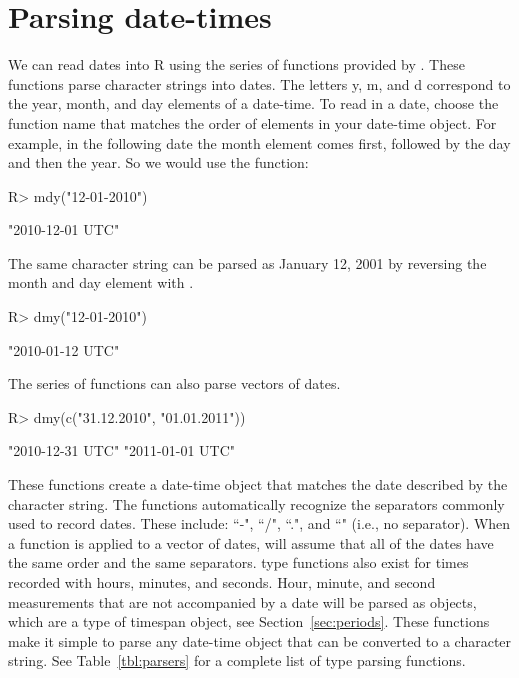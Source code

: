 \documentclass[article]{jss}
\begin{document}





\section{Parsing date-times}
\label{sec:parsing}

We can read dates into R using the  series of functions provided by . These functions parse character strings into dates. The letters y, m, and d correspond to the year, month, and day elements of a date-time. To read in a date, choose the function name that matches the order of elements in your date-time object. For example, in the following date the month element comes first, followed by the day and then the year. So we would use the  function:

\begin{CodeInput}
R> mdy("12-01-2010")
\end{CodeInput}
\begin{CodeOutput}
[1] "2010-12-01 UTC"
\end{CodeOutput}

The same character string can be parsed as January 12, 2001 by reversing the month and day element with .

\begin{CodeInput}
R> dmy("12-01-2010")
\end{CodeInput}
\begin{CodeOutput}
[1] "2010-01-12 UTC"
\end{CodeOutput}

The  series of functions can also parse vectors of dates.

\begin{CodeInput}
R> dmy(c("31.12.2010", "01.01.2011"))
\end{CodeInput}
\begin{CodeOutput}
[1] "2010-12-31 UTC" "2011-01-01 UTC"
\end{CodeOutput}


These functions create a  date-time object that matches the date described by the character string.  The functions automatically recognize the separators commonly used to record dates. These include: ``-", ``/", ``.", and ``" (i.e., no separator).  When a  function is applied to a vector of dates,  will assume that all of the dates have the same order and the same separators.  type functions also exist for times recorded with hours, minutes, and seconds. Hour, minute, and second measurements that are not accompanied by a date will be parsed as  objects, which are a type of timespan object, see Section~\ref{sec:periods}. These functions make it simple to parse any date-time object that can be converted to a character string. See Table~\ref{tbl:parsers} for a complete list of  type parsing functions. 
\end{document}
